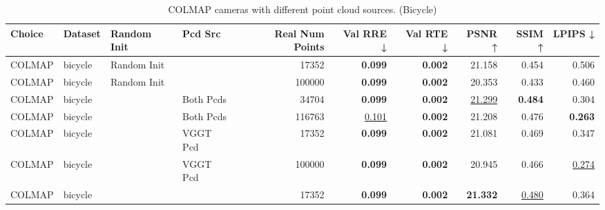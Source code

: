 \begin{table}[H]
\caption{COLMAP cameras with different point cloud sources. (Bicycle)}
\label{tab:06_isolated_cams_point_clouds_bicycle}
\centering
\scriptsize
\begin{tabular}{llllrrrrrr}
\toprule
Choice & Dataset & Random Init & Pcd Src & Real Num Points & Val RRE ↓ & Val RTE ↓ & PSNR ↑ & SSIM ↑ & LPIPS ↓ \\
\midrule
COLMAP & bicycle & Random Init &  & 17352 & \textbf{0.099} & \textbf{0.002} & 21.158 & 0.454 & 0.506 \\
COLMAP & bicycle & Random Init &  & 100000 & \textbf{0.099} & \textbf{0.002} & 20.353 & 0.433 & 0.460 \\
COLMAP & bicycle &  & Both Pcds & 34704 & \textbf{0.099} & \textbf{0.002} & \underline{21.299} & \textbf{0.484} & 0.304 \\
COLMAP & bicycle &  & Both Pcds & 116763 & \underline{0.101} & \textbf{0.002} & 21.208 & 0.476 & \textbf{0.263} \\
COLMAP & bicycle &  & VGGT Pcd & 17352 & \textbf{0.099} & \textbf{0.002} & 21.081 & 0.469 & 0.347 \\
COLMAP & bicycle &  & VGGT Pcd & 100000 & \textbf{0.099} & \textbf{0.002} & 20.945 & 0.466 & \underline{0.274} \\
COLMAP & bicycle &  &  & 17352 & \textbf{0.099} & \textbf{0.002} & \textbf{21.332} & \underline{0.480} & 0.364 \\
\bottomrule
\end{tabular}
\end{table}
